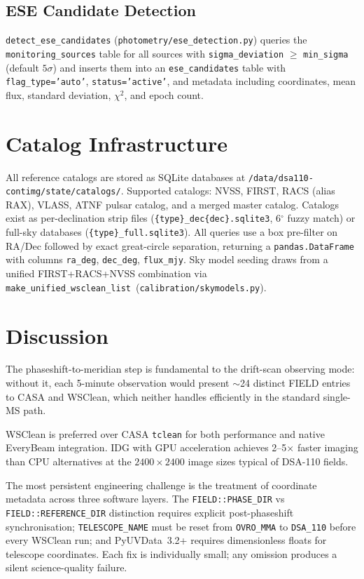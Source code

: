 \documentclass[12pt,a4paper]{article}
\newcommand{\degr}{\ensuremath{^\circ}}
\begin{document}
\subsection{ESE Candidate Detection}

\texttt{detect\_ese\_candidates} (\texttt{photometry/ese\_detection.py})
queries the \texttt{monitoring\_sources} table for all sources with
\texttt{sigma\_deviation} $\geq$ \texttt{min\_sigma} (default $5\sigma$)
and inserts them into an \texttt{ese\_candidates} table with
\texttt{flag\_type='auto'}, \texttt{status='active'}, and metadata
including coordinates, mean flux, standard deviation, $\chi^2$, and
epoch count.

\section{Catalog Infrastructure}

All reference catalogs are stored as SQLite databases at
\texttt{/data/dsa110-contimg/state/catalogs/}.  Supported catalogs:
NVSS, FIRST, RACS (alias RAX), VLASS, ATNF pulsar catalog, and a merged
master catalog.  Catalogs exist as per-declination strip files
(\texttt{\{type\}\_dec\{dec\}.sqlite3}, $6\degr$ fuzzy match) or full-sky
databases (\texttt{\{type\}\_full.sqlite3}).  All queries use a box
pre-filter on RA/Dec followed by exact great-circle separation, returning
a \texttt{pandas.DataFrame} with columns \texttt{ra\_deg},
\texttt{dec\_deg}, \texttt{flux\_mjy}.  Sky model seeding draws from a
unified FIRST+RACS+NVSS combination via
\texttt{make\_unified\_wsclean\_list}~(\texttt{calibration/skymodels.py}).

\section{Discussion}

The phaseshift-to-meridian step is fundamental to the drift-scan observing
mode: without it, each 5-minute observation would present $\sim$24 distinct
FIELD entries to CASA and WSClean, which neither handles efficiently in the
standard single-MS path.

WSClean is preferred over CASA \texttt{tclean} for both performance and native
EveryBeam integration.  IDG with GPU acceleration achieves 2--5$\times$ faster
imaging than CPU alternatives at the $2400 \times 2400$ image sizes typical of
DSA-110 fields.

The most persistent engineering challenge is the treatment of coordinate
metadata across three software layers.  The \texttt{FIELD::PHASE\_DIR}
vs \texttt{FIELD::REFERENCE\_DIR} distinction requires explicit post-phaseshift
synchronisation; \texttt{TELESCOPE\_NAME} must be reset from
\texttt{OVRO\_MMA} to \texttt{DSA\_110} before every WSClean run; and
PyUVData~3.2+ requires dimensionless floats for telescope coordinates.  Each
fix is individually small; any omission produces a silent science-quality
failure.
\end{document}
